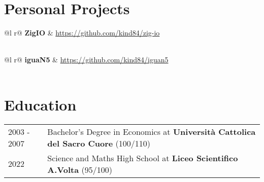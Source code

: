 \documentclass[a4paper,11pt]{article}
\begin{document}
\section{Personal Projects}

\begin{tabularx}{\linewidth}{ @{}l r@{} }
\textbf{ZigIO} & \hfill \href{https://github.com/kind84/zig-io}{https://github.com/kind84/zig-io} \\[3.75pt]
  \\
\end{tabularx}

\begin{tabularx}{\linewidth}{ @{}l r@{} }
\textbf{iguaN5} & \hfill \href{https://github.com/kind84/iguan5}{https://github.com/kind84/iguan5} \\[3.75pt]
  \\
\end{tabularx}

\section{Education}
\begin{tabularx}{\linewidth}{@{}l X@{}}	
2003 - 2007 & Bachelor's Degree in Economics at \textbf{Università Cattolica del Sacro Cuore} \hfill (100/110) \\ 

2022 & Science and Maths High School at \textbf{Liceo Scientifico A.Volta} \hfill  (95/100) \\
\end{tabularx}

\end{document}
